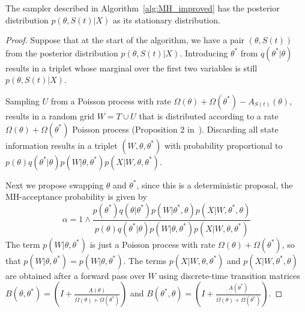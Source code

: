 \begin{proposition}
  The sampler described in Algorithm~\ref{alg:MH_improved} has the posterior
  distribution $p(\theta,S(t)|X)$ as its stationary distribution.
\end{proposition}
\begin{proof}
  Suppose that at the start of the algorithm, we have a pair $(\theta,S(t))$ from
  the posterior distribution $p(\theta,S(t)|X)$. Introducing $\theta^*$
  from $q(\theta^*|\theta)$ results in a triplet whose marginal over the first
  two variables is still $p(\theta,S(t)|X)$.

  Sampling $U$ from a Poisson process with rate $\Omega(\theta) +
  \Omega(\theta^*) - A_{S(t)}(\theta)$, results in a random grid $W = T \cup U$
  that is distributed according to a rate $\Omega(\theta) + \Omega(\theta^*)$
  Poisson process (Proposition 2 in~\cite{RaoTeh13}). Discarding all state 
  information results in a triplet $(W,\theta,\theta^*)$ with probability
  proportional to $p(\theta)q(\theta^*|\theta)p(W|\theta,\theta^*)
  p(X|W,\theta,\theta^*)$.

Next we propose swapping $\theta$ and $\theta^*$, since this
is a deterministic proposal, the MH-acceptance probability is given by
$$\alpha = 1 \wedge \frac{p(\theta^*)q(\theta|\theta^*)p(W|\theta^*,\theta)
p(X|W,\theta^*,\theta)}{p(\theta)q(\theta^*|\theta)p(W|\theta,\theta^*)
p(X|W,\theta,\theta^*)}$$
The term $p(W|\theta,\theta^*)$ is just a Poisson process with rate $\Omega(\theta)+
\Omega(\theta^*)$, so that $p(W|\theta,\theta^*) = p(W|\theta,\theta^*)$. The
terms $p(X|W,\theta,\theta^*)$ and $p(X|W,\theta^*,\theta)$ are obtained
after a forward pass over $W$ using discrete-time transition matrices
$B(\theta,\theta^*) = \left(I + \frac{A(\theta)}{\Omega(\theta)+\Omega(\theta^*)}\right)$ 
and $B(\theta^*,\theta) = \left(I + \frac{A(\theta^*)}{\Omega(\theta)+\Omega(\theta^*)}\right)$. 


\end{proof}
